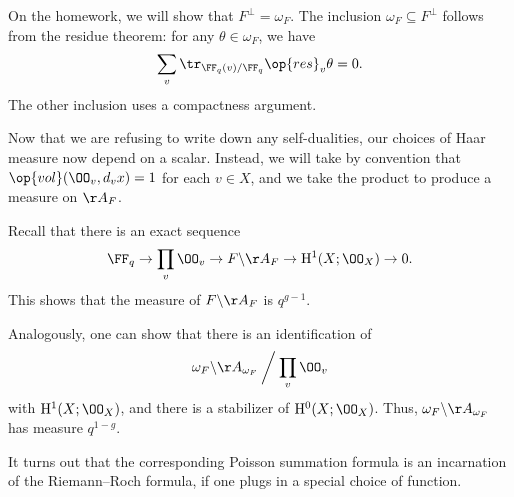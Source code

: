 \documentclass[../notes.tex]{subfiles}
\begin{document}
\begin{remark}
	On the homework, we will show that $F^\perp=\omega_F$. The inclusion $\omega_F\subseteq F^\perp$ follows from the residue theorem: for any $\theta\in\omega_F$, we have
	\[\sum_v\tr_{\FF_q(v)/\FF_q}\op{res}_v\theta=0.\]
	The other inclusion uses a compactness argument.
\end{remark}
Now that we are refusing to write down any self-dualities, our choices of Haar measure now depend on a scalar. Instead, we will take by convention that $\op{vol}(\OO_v,d_vx)=1$ for each $v\in X$, and we take the product to produce a measure on $\AA_F$.
\begin{example}
	Recall that there is an exact sequence
	\[\FF_q\to\prod_v\OO_v\to F\backslash\AA_F\to\mathrm H^1(X;\OO_X)\to0.\]
	This shows that the measure of $F\backslash\AA_F$ is $q^{g-1}$.
\end{example}
\begin{example}
	Analogously, one can show that there is an identification of
	\[\omega_F\backslash\AA_{\omega_F}\mathbin{\bigg/}\prod_v\OO_v\]
	with $\mathrm H^1(X;\OO_X)$, and there is a stabilizer of $\mathrm H^0(X;\OO_X)$. Thus, $\omega_F\backslash\AA_{\omega_F}$ has measure $q^{1-g}$.
\end{example}
\begin{remark}
	It turns out that the corresponding Poisson summation formula is an incarnation of the Riemann--Roch formula, if one plugs in a special choice of function.
\end{remark}
\end{document}
